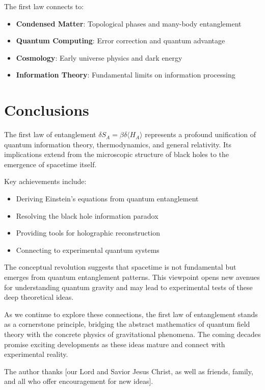 \documentclass[11pt,letterpaper]{article}
\begin{document}
The first law connects to:
\begin{itemize}
\item \textbf{Condensed Matter}: Topological phases and many-body entanglement
\item \textbf{Quantum Computing}: Error correction and quantum advantage
\item \textbf{Cosmology}: Early universe physics and dark energy
\item \textbf{Information Theory}: Fundamental limits on information processing
\end{itemize}

\section{Conclusions}

The first law of entanglement $\delta S_A = \beta\delta\langle H_A\rangle$ represents a profound unification of quantum information theory, thermodynamics, and general relativity. Its implications extend from the microscopic structure of black holes to the emergence of spacetime itself.

Key achievements include:
\begin{itemize}
\item Deriving Einstein's equations from quantum entanglement
\item Resolving the black hole information paradox
\item Providing tools for holographic reconstruction
\item Connecting to experimental quantum systems
\end{itemize}

The conceptual revolution suggests that spacetime is not fundamental but emerges from quantum entanglement patterns. This viewpoint opens new avenues for understanding quantum gravity and may lead to experimental tests of these deep theoretical ideas.

As we continue to explore these connections, the first law of entanglement stands as a cornerstone principle, bridging the abstract mathematics of quantum field theory with the concrete physics of gravitational phenomena. The coming decades promise exciting developments as these ideas mature and connect with experimental reality.

\begin{acknowledgments}
The author thanks [our Lord and Savior Jesus Christ, as well as friends, family, and all who offer encouragement for new ideas].
\end{acknowledgments}
\end{document}

